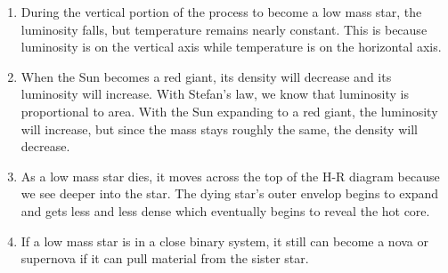 \documentclass[../hw2.tex]{subfiles}
\begin{document}
    
    \begin{enumerate}
        \item {} During the vertical portion of the process to become a low mass star, the luminosity falls, but temperature remains nearly constant. This is because luminosity is on the vertical axis while temperature is on the horizontal axis.
        \item {} When the Sun becomes a red giant, its density will decrease and its luminosity will increase. With Stefan's law, we know that luminosity is proportional to area. With the Sun expanding to a red giant, the luminosity will increase, but since the mass stays roughly the same, the density will decrease.
        \item {} As a low mass star dies, it moves across the top of the H-R diagram because we see deeper into the star. The dying star's outer envelop begins to expand and gets less and less dense which eventually begins to reveal the hot core.
        \item {} If a low mass star is in a close binary system, it still can become a nova or supernova if it can pull material from the sister star. 
    \end{enumerate}
    
\end{document}
